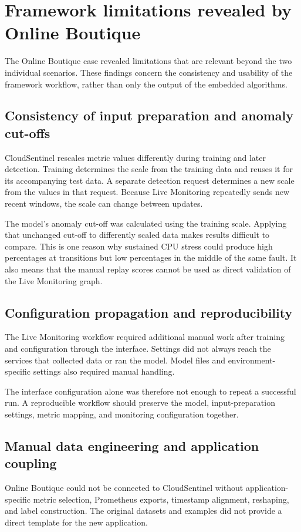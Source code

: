 \section{Framework limitations revealed by Online Boutique}
The Online Boutique case revealed limitations that are relevant beyond the two individual scenarios. These findings concern the consistency and usability of the framework workflow, rather than only the output of the embedded algorithms.

\subsection{Consistency of input preparation and anomaly cut-offs}
\label{sec:preprocessing_threshold_consistency}
CloudSentinel rescales metric values differently during training and later detection. Training determines the scale from the training data and reuses it for its accompanying test data. A separate detection request determines a new scale from the values in that request. Because Live Monitoring repeatedly sends new recent windows, the scale can change between updates.

The model's anomaly cut-off was calculated using the training scale. Applying that unchanged cut-off to differently scaled data makes results difficult to compare. This is one reason why sustained CPU stress could produce high percentages at transitions but low percentages in the middle of the same fault. It also means that the manual replay scores cannot be used as direct validation of the Live Monitoring graph.

\subsection{Configuration propagation and reproducibility}
The Live Monitoring workflow required additional manual work after training and configuration through the interface. Settings did not always reach the services that collected data or ran the model. Model files and environment-specific settings also required manual handling.

The interface configuration alone was therefore not enough to repeat a successful run. A reproducible workflow should preserve the model, input-preparation settings, metric mapping, and monitoring configuration together.

\subsection{Manual data engineering and application coupling}
Online Boutique could not be connected to CloudSentinel without application-specific metric selection, Prometheus exports, timestamp alignment, reshaping, and label construction. The original datasets and examples did not provide a direct template for the new application.

